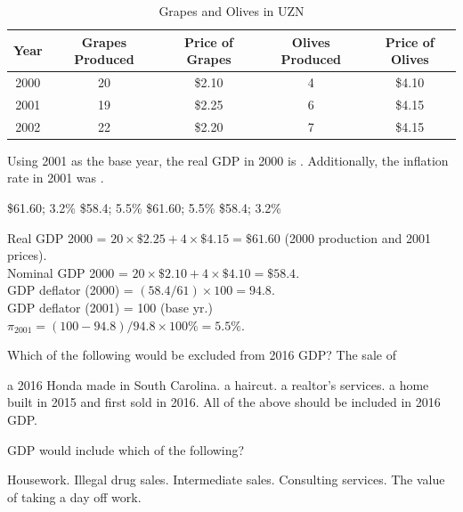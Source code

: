 \documentclass[addpoints,11pt]{exam}
\theoremstyle{definition}
\newcommand{\blank}[0]{\underline{\hspace{3cm}}}
\begin{document}
\begin{questions}
		\begin{table}[H]
			\caption{Grapes and Olives in UZN}
			\centering
			\begin{tabular}{c|c|c|c|c}
				Year & Grapes Produced & Price of Grapes & Olives Produced & Price of Olives \\
				\hline
				2000 & 20 & \$2.10 & 4 & \$4.10\\
				2001 & 19 & \$2.25 & 6 & \$4.15\\
				2002 & 22 & \$2.20 & 7 & \$4.15\\
			\end{tabular} 
			\label{MC23}
		\end{table}
		
			Using 2001 as the base year, the real GDP in 2000 is \blank. Additionally, the inflation rate in 2001 was \blank.
			
			\begin{choices}
				\choice \$61.60; 3.2\%
				\choice \$58.4; 5.5\%
				\CorrectChoice \$61.60; 5.5\%
				\choice \$58.4; 3.2\%
			\end{choices}
			
			\begin{solution}
				Real GDP 2000 = $20 \times \$2.25 + 4 \times \$4.15 = \$61.60$ (2000 production and 2001 prices). \\
				Nominal GDP 2000 = $20 \times \$2.10 + 4\times \$4.10 = \$58.4$. \\ GDP deflator (2000) = $(58.4/61)\times 100 = 94.8$. \\
				GDP deflator (2001) = 100 (base yr.) \\
				$\pi_{2001} = (100-94.8)/94.8\times 100\% = 5.5\%$.
			\end{solution}
			
\question Which of the following would be excluded from 2016 GDP? The sale of 

\begin{choices}
	\choice a 2016 Honda made in South Carolina.
	\choice a haircut.
	\choice a realtor's services.
	\CorrectChoice a home built in 2015 and first sold in 2016.
	\choice All of the above should be included in 2016 GDP.
\end{choices}

\question GDP would include which of the following?

\begin{choices}
	\choice Housework.
	\choice Illegal drug sales.
	\choice Intermediate sales.
	\CorrectChoice Consulting services.
	\choice The value of taking a day off work.
\end{choices}


\end{questions}
\end{document}
